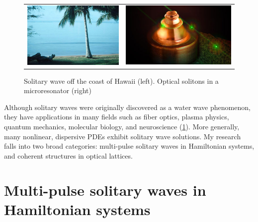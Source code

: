 \documentclass[12pt,reqno,oneside,hidelinks]{article}
\begin{document}
\begin{figure}[H]
    \centering
    \begin{tabular}{cc}
        \includegraphics[width=7cm]{images/SolitaryWaveHawaii.png} &
        \includegraphics[width=8.1cm]{images/resonator.jpg} 
    \end{tabular}
    \caption{Solitary wave off the coast of Hawaii \cite{Andriopoulos2009} (left). Optical solitons in a microresonator \cite{MarinPalomo2017} (right) }
    \label{fig:solitarywaves}
\end{figure}
Although solitary waves were originally discovered as a water wave phenomenon, they have applications in many fields such as fiber optics, plasma physics, quantum mechanics, molecular biology, and neuroscience (\cref{fig:solitarywaves}). More generally, many nonlinear, dispersive PDEs exhibit solitary wave solutions. My research falls into two broad categories: multi-pulse solitary waves in Hamiltonian systems, and coherent structures in optical lattices. 

\section*{Multi-pulse solitary waves in Hamiltonian systems}
\end{document}
